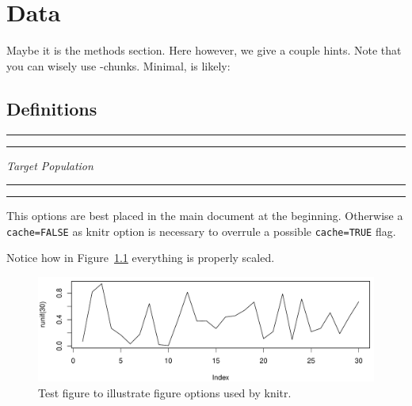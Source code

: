 

\chapter{Data} 
Maybe it is the methods section. Here however, we give a couple hints.
Note that you can wisely use -chunks. Minimal, is likely: 

\bigskip

\section{Definitions}


% 



\hrule

\hrule
\bigskip

\textit{Target Population}

\bigskip
\hrule
\bigskip



\hrule

\bigskip 

This options are best placed in the main document at the beginning. Otherwise a \verb+cache=FALSE+ as knitr option is necessary to overrule a possible  \verb+cache=TRUE+ flag. 

\bigskip 

Notice how in Figure~\ref{f02:1} everything is properly scaled.   

\begin{figure}
\begin{knitrout}
\color{fgcolor}

{\centering \includegraphics[width=\textwidth-3cm]{figure/ch02_figunnamed-chunk-3-1} 

}


\end{knitrout}
  \caption{Test figure to illustrate figure options used by knitr.}
  \label{f02:1}
\end{figure}


